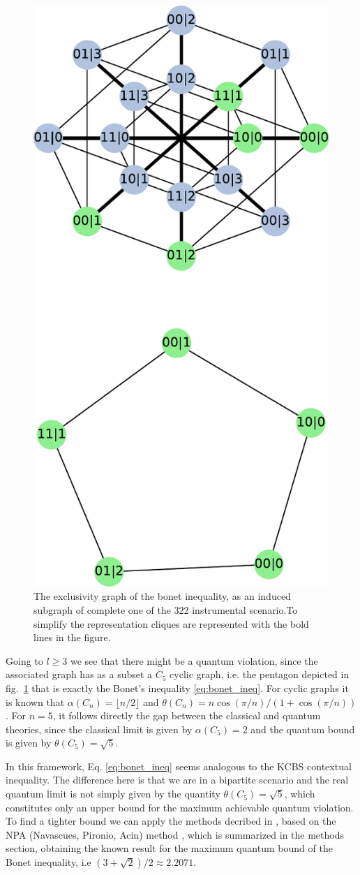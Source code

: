 \documentclass[letterpaper]{article}
\begin{document}
\begin{figure}[h]
    \centering
    \includegraphics[width=.6\columnwidth]{images/instrumental_c5.pdf}
    \caption{The exclusivity graph of the bonet inequality, as an induced
    subgraph of complete one of the $322$ instrumental scenario.To
    simplify the representation cliques are represented with the bold
    lines in the figure.}
    \label{fig:bonetexc}
\end{figure}

Going to $l\ge3$ we see that there might be a quantum violation, since the
associated graph has as a subset a $C_5$ cyclic graph, i.e. the pentagon
depicted in
fig.~\ref{fig:bonetexc} that is exactly the Bonet's inequality \eqref{eq:bonet_ineq}.
For cyclic graphs it is known that $\alpha(C_n) = \lfloor n/2 \rfloor$ and
$\theta(C_n) = n\cos(\pi/n)/(1+\cos(\pi/n))$. For $n=5$, it follows directly the
gap between the classical and quantum theories, since the classical limit is
given by $\alpha(C_5)=2$ and the quantum bound is given by $\theta(C_5)=\sqrt{5}$.

In this framework, Eq. \eqref{eq:bonet_ineq} seems analogous to the KCBS contextual
inequality\cite{kcbs2008}.
The difference here is that we are in a bipartite scenario and the real quantum
limit is not simply given by the quantity $\theta(C_5) = \sqrt{5}$, which
constitutes only an upper bound for the maximum achievable quantum violation.
To find a tighter bound we can apply the methods decribed in
\cite{rabelo2014}, based on the NPA (Navascues, Pironio, Acin) method
\cite{npa2008}, which is summarized in the methods section, obtaining the known
result for the maximum quantum bound of the Bonet inequality, i.e
$(3+\sqrt{2})/2 \approx 2.2071$.
\end{document}
